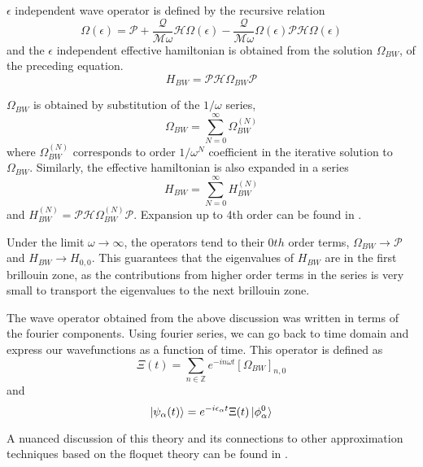$\epsilon$ independent wave operator is defined by the recursive relation
\begin{equation}
 \label{chap_5:omegabw}\Omega(\epsilon) = \mathcal{P} + \frac{\mathcal{Q}}{\mathcal{M}\omega}\mathcal{H}\Omega(\epsilon) - \frac{\mathcal{Q}}{\mathcal{M}\omega}\Omega(\epsilon)\mathcal{P}\mathcal{H}\Omega(\epsilon)
\end{equation} and the $\epsilon$ independent effective hamiltonian is obtained from the solution $\Omega_{BW}$, of the preceding equation.
\begin{equation}
 H_{BW} = \mathcal{P}\mathcal{H}\Omega_{BW}\mathcal{P}
\end{equation}

$\Omega_{BW}$ is obtained by substitution of the $1/\omega$ series, 
\begin{equation*}
 \Omega_{BW} = \sum_{N=0}^{\infty}{\Omega_{BW}^{(N)}}
\end{equation*} where $\Omega_{BW}^{(N)}$ corresponds to order $1/\omega^N$ coefficient in the iterative solution to $\Omega_{BW}$. Similarly, the effective hamiltonian
is also expanded in a series \begin{equation*}
 H_{BW} = \sum_{N=0}^{\infty}{H_{BW}^{(N)}}
\end{equation*} and $H_{BW}^{(N)} = \mathcal{P}\mathcal{H}\Omega_{BW}^{(N)}\mathcal{P}$. Expansion up to 4th order can be found in \parencite{mikami2016brillouin}.

Under the limit $\omega \rightarrow \infty$, the operators tend to their $0th$ order terms, $\Omega_{BW} \rightarrow \mathcal{P}$ and $H_{BW} \rightarrow H_{0,0}$. This guarantees that the eigenvalues of 
$H_{BW}$ are in the first brillouin zone, as the contributions from higher order terms in the series is very small to transport the eigenvalues to the next brillouin zone.

The wave operator obtained from the above discussion was written in terms of the fourier components. Using fourier series, we can go back to time domain and express our 
wavefunctions as a function of time. This operator is defined as
\begin{equation}
 \Xi(t) = \sum_{n\in\mathbb{Z}}{e^{-in\omega t}[\Omega_{BW}]_{n,0}}
\end{equation}
and
\begin{equation}
 \ket{\psi_{\alpha}(t)} = e^{-i\epsilon_\alpha t}\Xi(t)\ket{\phi_\alpha^0}
\end{equation}

A nuanced discussion of this theory and its connections to other approximation techniques based on the floquet theory can be found in \parencite{mikami2016brillouin}.
